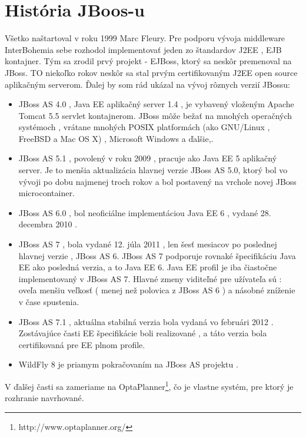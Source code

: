 \section{História JBoos-u}
Všetko naštartoval v roku 1999 Marc Fleury. Pre podporu vývoja middleware InterBohemia sebe rozhodol implementovať jeden zo štandardov J2EE , EJB kontajner. Tým sa zrodil prvý projekt - EJBoss, ktorý sa neskôr premenoval na JBoss. TO niekoľko rokov neskôr sa stal prvým certifikovaným  J2EE  open source aplikačným serverom. Ďalej by som rád ukázal na vývoj rôznych verzií JBossu:


\begin{itemize}
\item JBoss AS 4.0 , Java EE aplikačný server 1.4 , je vybavený vloženým Apache Tomcat 5.5 servlet kontajnerom. JBoss môže bežať na mnohých operačných systémoch , vrátane mnohých POSIX platformách (ako GNU/Linux , FreeBSD a Mac OS X) , Microsoft Windows a ďalšie,.
\item JBoss AS 5.1 , povolený v roku 2009 , pracuje ako Java EE 5 aplikačný server. Je to menšia aktualizácia hlavnej verzie JBoss AS 5.0, ktorý bol vo vývoji po dobu najmenej troch rokov a bol postavený na vrchole novej JBoss microcontainer.

\item JBoss AS 6.0 , bol neoficiálne implementáciou Java EE 6 , vydané 28. decembra 2010 .

\item JBoss AS 7 , bola vydané 12. júla 2011 , len šesť mesiacov po poslednej hlavnej verzie , JBoss AS 6. JBoss AS 7 podporuje rovnaké špecifikáciu Java EE ako posledná verzia, a to Java EE 6. Java EE profil je iba čiastočne implementovaný v JBoss AS 7. Hlavné zmeny viditeľné pre užívateľa sú : oveľa menšiu veľkosť ( menej než polovica z JBoss AS 6 ) a násobné zníženie v čase spustenia.

\item JBoss AS 7.1 , aktuálna stabilná verzia bola vydaná vo februári 2012 . Zostávajúce časti EE špecifikácie boli realizované , a táto verzia bola certifikovaná pre EE plnom profile.

\item WildFly 8 je priamym pokračovaním na JBoss AS projektu .

\end{itemize}

V ďalšej časti sa zameriame na OptaPlanner\footnote{http://www.optaplanner.org/}, čo je vlastne systém, pre ktorý je rozhranie navrhované.


